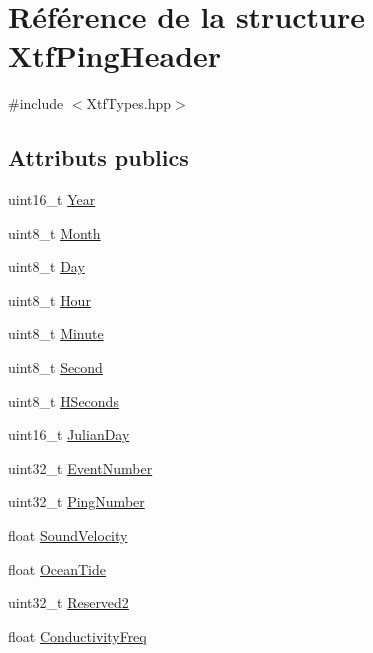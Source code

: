 \hypertarget{structXtfPingHeader}{}\section{Référence de la structure Xtf\+Ping\+Header}
\label{structXtfPingHeader}


{\ttfamily \#include $<$Xtf\+Types.\+hpp$>$}

\subsection*{Attributs publics}
\begin{DoxyCompactItemize}
\item 
uint16\+\_\+t \hyperlink{structXtfPingHeader_a9cda24d1b0cc5ace7b9cba5b1f0caf85}{Year}
\item 
uint8\+\_\+t \hyperlink{structXtfPingHeader_a4886fadcf6fd6d13db542d07f7e23269}{Month}
\item 
uint8\+\_\+t \hyperlink{structXtfPingHeader_a94f7114684926ee407d7168a7d2bb104}{Day}
\item 
uint8\+\_\+t \hyperlink{structXtfPingHeader_acbf30dd1ebd8416ca4cc969f117c0854}{Hour}
\item 
uint8\+\_\+t \hyperlink{structXtfPingHeader_a3f34dac271fc6b2ed5618f49cd642d15}{Minute}
\item 
uint8\+\_\+t \hyperlink{structXtfPingHeader_a83d68cd9692b973fcd4412b319c9b1a8}{Second}
\item 
uint8\+\_\+t \hyperlink{structXtfPingHeader_ae1ac0020439ea0fb39f73c8689ae8791}{H\+Seconds}
\item 
uint16\+\_\+t \hyperlink{structXtfPingHeader_a8c3cd4f05edeb7de12307c7a7136ce33}{Julian\+Day}
\item 
uint32\+\_\+t \hyperlink{structXtfPingHeader_ad3ce92406211b07295786dbb6187d2a6}{Event\+Number}
\item 
uint32\+\_\+t \hyperlink{structXtfPingHeader_a22617daf03da6c0378d3832fe2275f58}{Ping\+Number}
\item 
float \hyperlink{structXtfPingHeader_a99d4cbd7eb9c74bb4a8fd2d85da1a499}{Sound\+Velocity}
\item 
float \hyperlink{structXtfPingHeader_a2da14eac074067bdb52d0e3cb8702dc4}{Ocean\+Tide}
\item 
uint32\+\_\+t \hyperlink{structXtfPingHeader_a412ddd8940a44731043661b69d6eb256}{Reserved2}
\item 
float \hyperlink{structXtfPingHeader_a0ebdbaa7e8dbe0107a023c03a18fd7b1}{Conductivity\+Freq}

\end{DoxyCompactItemize}
